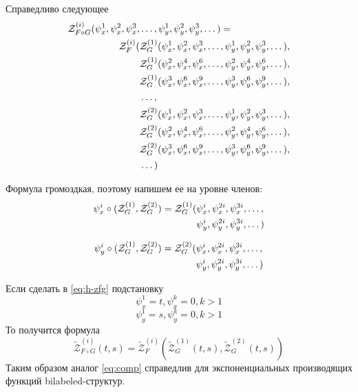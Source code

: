 \begin{theorem}
Справедливо следующее
\label{th:z-main}
\begin{equation}
\begin{split}
\label{eq:h-zfg}
	\mathcal Z^{(i)}_{F \circ G} (\psi_x^1, \psi_x^2, \psi_x^3, &\dots, 
	\psi_y^1, \psi_y^2, \psi_y^3, \dots) = \\
	\mathcal Z_F^{(i)}(
		&\mathcal Z^{(1)}_G(\psi_x^1, \psi_x^2, \psi_x^3, \dots, 
					 \psi_y^1, \psi_y^2, \psi_y^3, \dots), \\
		&\mathcal Z^{(1)}_G(\psi_x^2, \psi_x^4, \psi_x^6, \dots, 
					 \psi_y^2, \psi_y^4, \psi_y^6, \dots), \\
		&\mathcal Z^{(1)}_G(\psi_x^3, \psi_x^6, \psi_x^9, \dots, 
					 \psi_y^3, \psi_y^6, \psi_y^9, \dots), \\
		&\dots, \\
		&\mathcal Z^{(2)}_G(\psi_x^1, \psi_x^2, \psi_x^3, \dots, 
					 \psi_y^1, \psi_y^2, \psi_y^3, \dots), \\
		&\mathcal Z^{(2)}_G(\psi_x^2, \psi_x^4, \psi_x^6, \dots, 
					 \psi_y^2, \psi_y^4, \psi_y^6, \dots), \\
		&\mathcal Z^{(2)}_G(\psi_x^3, \psi_x^6, \psi_x^9, \dots, 
					 \psi_y^3, \psi_y^6, \psi_y^9, \dots), \\
		&\dots
	)
\end{split}	
\end{equation}
\end{theorem}
Формула громоздкая, поэтому напишем ее на уровне членов:
\begin{equation*}
\begin{split}
\psi_x^i \circ (\mathcal Z^{(1)}_G, \mathcal Z^{(2)}_G ) = \mathcal Z^{(1)}_G
(&\psi_x^i, \psi_x^{2i}, \psi_x^{3i}, \dots, \\
&\psi_y^i, \psi_y^{2i}, \psi_y^{3i}, \dots)
\end{split}
\end{equation*}

\begin{equation*}
\begin{split}
\psi_y^i \circ (\mathcal Z^{(1)}_G, \mathcal Z^{(2)}_G ) = \mathcal Z^{(2)}_G
(&\psi_x^i, \psi_x^{2i}, \psi_x^{3i}, \dots, \\
&\psi_y^i, \psi_y^{2i}, \psi_y^{3i}, \dots)
\end{split}
\end{equation*}

\begin{remark}
Если сделать в \ref{eq:h-zfg} подстановку 
$$
\psi_{x}^1 = t, \psi_{x}^k = 0, k>1
$$
$$
\psi_y^1 = s, \psi_y^k = 0, k>1
$$
То получится формула
$$
\tilde{\mathcal Z}^{(i)}_{F \circ G} (t, s) = 
	\tilde{\mathcal Z}_F^{(i)} (
		\tilde{\mathcal Z}_G^{(1)} (t, s), 
		\tilde{\mathcal Z}_G^{(2)} (t, s))
$$
Таким образом аналог \ref{eq:comp} справедлив для
экспоненциальных производящих функций bilabeled-структур.
\end{remark}


